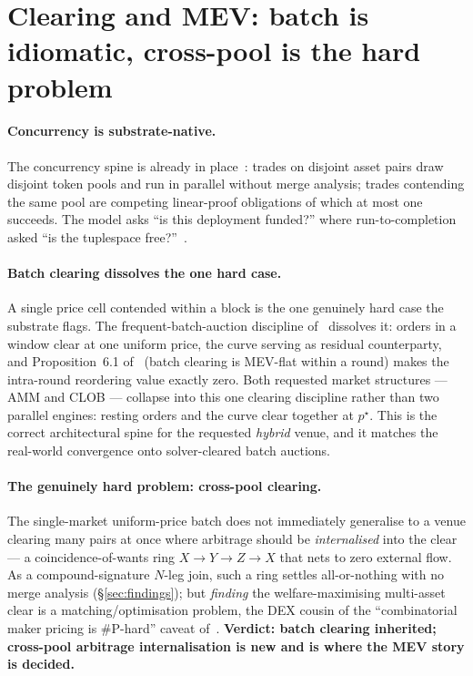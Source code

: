 \documentclass[11pt]{article}
\theoremstyle{definition}
\begin{document}
\section{Clearing and MEV: batch is idiomatic, cross-pool is the hard problem}\label{sec:clearing}

\paragraph{Concurrency is substrate-native.}
The concurrency spine is already in place~\cite[\S2.3,\S8.8]{cost}: trades on disjoint asset pairs
draw disjoint token pools and run in parallel without merge analysis; trades contending the same pool
are competing linear-proof obligations of which at most one succeeds. The model asks ``is this
deployment funded?'' where run-to-completion asked ``is the tuplespace free?''~\cite[Rmk.\,2.1]{cost}.

\paragraph{Batch clearing dissolves the one hard case.}
A single price cell contended within a block is the one genuinely hard case the substrate flags. The
frequent-batch-auction discipline of~\cite[\S6.2]{predmkt} dissolves it: orders in a window clear at
one uniform price, the curve serving as residual counterparty, and Proposition~6.1 of~\cite{predmkt}
(batch clearing is MEV-flat within a round) makes the intra-round reordering value exactly zero. Both
requested market structures --- AMM and CLOB --- collapse into this one clearing discipline rather than
two parallel engines: resting orders and the curve clear together at $p^\star$. This is the correct
architectural spine for the requested \emph{hybrid} venue, and it matches the real-world convergence
onto solver-cleared batch auctions.

\paragraph{The genuinely hard problem: cross-pool clearing.}
The single-market uniform-price batch does not immediately generalise to a venue clearing many pairs
at once where arbitrage should be \emph{internalised} into the clear --- a coincidence-of-wants ring
$X \to Y \to Z \to X$ that nets to zero external flow. As a compound-signature $N$-leg join, such a
ring settles all-or-nothing with no merge analysis (\S\ref{sec:findings}); but \emph{finding} the
welfare-maximising multi-asset clear is a matching/optimisation problem, the DEX cousin of the
``combinatorial maker pricing is \#P-hard'' caveat of~\cite[\S3]{predmkt}. \textbf{Verdict: batch
clearing inherited; cross-pool arbitrage internalisation is new and is where the MEV story is decided.}
\end{document}
